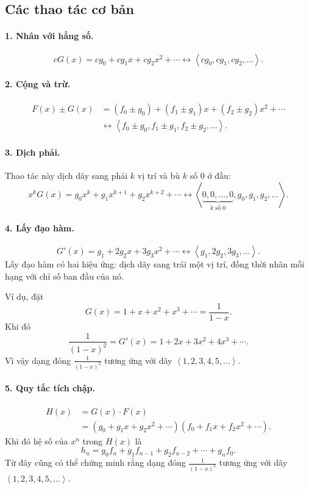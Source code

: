 \documentclass[11pt]{article}
\newcommand{\seq}[1]{\left\langle #1\right\rangle}
\begin{document}
\subsection{Các thao tác cơ bản}

\paragraph{1. Nhân với hằng số.}
\[
  cG(x)=cg_0+cg_1x+cg_2x^2+\cdots
  \longleftrightarrow \seq{cg_0,cg_1,cg_2,\ldots}.
\]

\paragraph{2. Cộng và trừ.}
\[
\begin{aligned}
  F(x)\pm G(x)
    &=(f_0\pm g_0)+(f_1\pm g_1)x+(f_2\pm g_2)x^2+\cdots\\
    &\longleftrightarrow
      \seq{f_0\pm g_0,f_1\pm g_1,f_2\pm g_2,\ldots}.
\end{aligned}
\]

\paragraph{3. Dịch phải.}
Thao tác này dịch dãy sang phải \(k\) vị trí và bù \(k\) số \(0\) ở đầu:
\[
  x^kG(x)=g_0x^k+g_1x^{k+1}+g_2x^{k+2}+\cdots
  \longleftrightarrow
  \seq{\underbrace{0,0,\ldots,0}_{k\text{ số }0},g_0,g_1,g_2,\ldots}.
\]

\paragraph{4. Lấy đạo hàm.}
\[
  G'(x)=g_1+2g_2x+3g_3x^2+\cdots
  \longleftrightarrow \seq{g_1,2g_2,3g_3,\ldots}.
\]
Lấy đạo hàm có hai hiệu ứng: dịch dãy sang trái một vị trí, đồng thời nhân
mỗi hạng với chỉ số ban đầu của nó.

Ví dụ, đặt
\[
  G(x)=1+x+x^2+x^3+\cdots=\frac1{1-x}.
\]
Khi đó
\[
  \frac1{(1-x)^2}=G'(x)=1+2x+3x^2+4x^3+\cdots.
\]
Vì vậy dạng đóng \(\frac1{(1-x)^2}\) tương ứng với dãy
\(\seq{1,2,3,4,5,\ldots}\).

\paragraph{5. Quy tắc tích chập.}
\[
\begin{aligned}
  H(x)&=G(x)\cdot F(x)\\
      &=(g_0+g_1x+g_2x^2+\cdots)(f_0+f_1x+f_2x^2+\cdots).
\end{aligned}
\]
Khi đó hệ số của \(x^n\) trong \(H(x)\) là
\[
  h_n=g_0f_n+g_1f_{n-1}+g_2f_{n-2}+\cdots+g_nf_0.
\]
Từ đây cũng có thể chứng minh rằng dạng đóng \(\frac1{(1-x)^2}\) tương ứng
với dãy \(\seq{1,2,3,4,5,\ldots}\).
\end{document}
